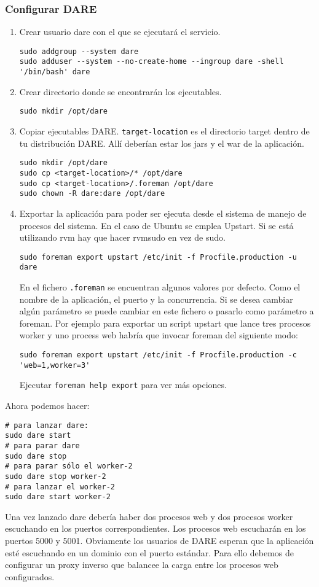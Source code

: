 \subsubsection{Configurar DARE}
\begin{enumerate}
  \item Crear usuario dare con el que se ejecutará el servicio. 
    \begin{verbatim}
sudo addgroup --system dare
sudo adduser --system --no-create-home --ingroup dare -shell '/bin/bash' dare
    \end{verbatim}
  \item Crear directorio donde se encontrarán los ejecutables.
    \begin{verbatim}
sudo mkdir /opt/dare
    \end{verbatim}
  \item Copiar ejecutables DARE. \verb+target-location+ es el
    directorio target dentro de tu distribución DARE. Allí deberían
    estar los jars y el war de la aplicación.
    \begin{verbatim}
sudo mkdir /opt/dare
sudo cp <target-location>/* /opt/dare
sudo cp <target-location>/.foreman /opt/dare
sudo chown -R dare:dare /opt/dare
    \end{verbatim}

  \item Exportar la aplicación para poder ser ejecuta desde el sistema
    de manejo de procesos del sistema. En el caso de Ubuntu se emplea
    Upstart. Si se está utilizando rvm hay que hacer
    rvmsudo en vez de sudo.

    \verb+sudo foreman export upstart /etc/init -f Procfile.production -u dare+

    En el fichero \verb+.foreman+ se encuentran algunos valores por
    defecto. Como el nombre de la aplicación, el puerto y la
    concurrencia. Si se desea cambiar algún parámetro se puede cambiar
    en este fichero o pasarlo como parámetro a foreman. Por ejemplo
    para exportar un script upstart que lance tres procesos worker y
    uno process web habría que invocar foreman del siguiente modo:

    \begin{verbatim}
sudo foreman export upstart /etc/init -f Procfile.production -c 'web=1,worker=3'
    \end{verbatim}
    Ejecutar \verb+foreman help export+ para ver más opciones.
\end{enumerate}

Ahora podemos hacer: 
\begin{verbatim}
# para lanzar dare:
sudo dare start
# para parar dare
sudo dare stop
# para parar sólo el worker-2
sudo dare stop worker-2
# para lanzar el worker-2
sudo dare start worker-2
\end{verbatim}
Una vez lanzado dare debería haber dos procesos web y dos procesos
worker escuchando en los puertos correspondientes. Los procesos web
escucharán en los puertos 5000 y 5001. Obviamente los usuarios de DARE
esperan que la aplicación esté escuchando en un dominio con el puerto
estándar. Para ello debemos de configurar un proxy inverso que balancee
la carga entre los procesos web configurados. 

